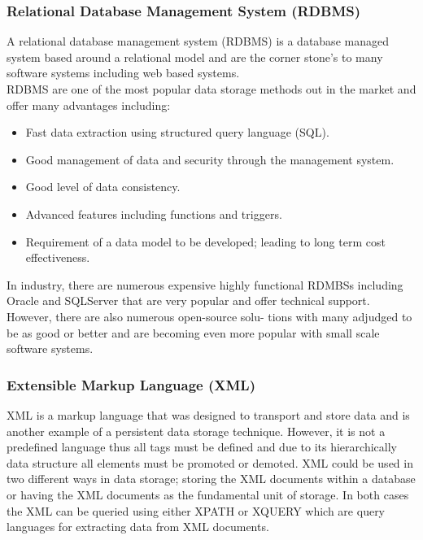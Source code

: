 \documentclass[12pt,a4paper]{article}
\begin{document}
\subsubsection{Relational Database Management System (RDBMS)}
	A relational database management system (RDBMS) is a database managed system based around a
relational model and are the corner stone’s to many software systems including web based systems.\\
RDBMS are one of the most popular data storage methods out in the market and offer many advantages
including:\\
\begin{itemize}
	\item Fast data extraction using structured query language (SQL).
	\item Good management of data and security through the management system.
	\item Good level of data consistency.
	\item Advanced features including functions and triggers.
	\item Requirement of a data model to be developed; leading to long term cost effectiveness. 
\end{itemize}
In industry, there are numerous expensive highly functional RDMBSs including Oracle and SQLServer
that are very popular and offer technical support. However, there are also numerous open-source solu-
tions with many adjudged to be as good or better and are becoming even more popular with small
scale software systems.
\subsubsection{Extensible Markup Language (XML)}
	XML is a markup language that was designed to transport and store data and is another example of
a persistent data storage technique. However, it is not a predefined language thus all tags must be
defined and due to its hierarchically data structure all elements must be promoted or demoted.
XML could be used in two different ways in data storage; storing the XML documents within a
database or having the XML documents as the fundamental unit of storage. In both cases the XML
can be queried using either XPATH or XQUERY which are query languages for extracting data from
XML documents.
\end{document}
